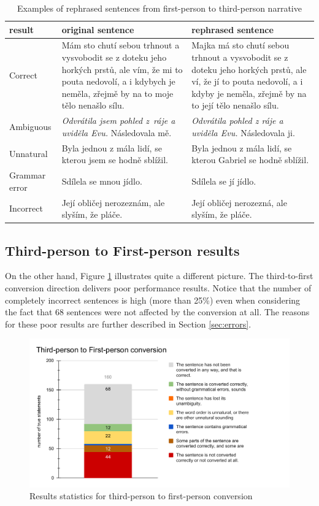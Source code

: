 \begin{table}[!ht]
	\caption{Examples of rephrased sentences from first-person to third-person narrative}
	\label{tab:example-first}
		\begin{tabular}{m{5em}|m{11em}|m{11em}}
			result & original sentence & rephrased sentence \\
			\hline
			Correct & Mám sto chutí sebou trhnout a vysvobodit se z doteku jeho horkých prstů, ale vím, že mi to pouta nedovolí, a i kdybych je neměla, zřejmě by na to moje tělo nenašlo sílu. &  Majka má sto chutí sebou trhnout a vysvobodit se z doteku jeho horkých prstů, ale ví, že jí to pouta nedovolí, a i kdyby je neměla, zřejmě by na to její tělo nenašlo sílu. \\
			Ambiguous & \emph{Odvrátila jsem pohled z~ráje a uviděla Evu.} Následovala mě. & \emph{Odvrátila pohled z ráje a uviděla Evu.} Následovala ji. \\
			Unnatural & Byla jednou z mála lidí, se kterou jsem se hodně sblížil. & Byla jednou z mála lidí, se kterou Gabriel se hodně sblížil. \\
			Grammar error & Sdílela se mnou jídlo. & Sdílela se jí jídlo. \\
			Incorrect & Její obličej nerozeznám, ale slyším, že pláče. & Její obličej nerozezná, ale slyším, že pláče. \\
		\end{tabular}
\end{table}


\subsection{Third-person to First-person results}
On the other hand, Figure \ref{fig:eval-third-to-first} illustrates quite a different picture. The third-to-first conversion direction delivers poor performance results. Notice that the number of completely incorrect sentences is high (more than 25\%) even when considering the fact that 68 sentences were not affected by the conversion at all.
The reasons for these poor results are further described in Section \ref{sec:errors}.

\begin{figure}[!ht]
\includegraphics[width=\textwidth]{data/Eval-Third-To-First.pdf}
\caption{Results statistics for third-person to first-person conversion}
\label{fig:eval-third-to-first}
\end{figure}

